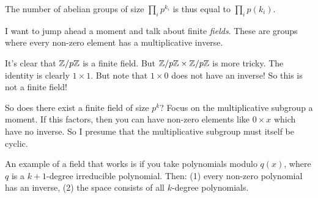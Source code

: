 \begin{remark}
  The number of abelian groups of size $\prod_i p^{k_i}$ is thus equal
  to $\prod_i p(k_i)$.
\end{remark}

\begin{remark}
  I want to jump ahead a moment and talk about finite \emph{fields}.
  These are groups where every non-zero element has a multiplicative
  inverse.

  It's clear that $\mathbb{Z} / p\mathbb{Z}$ is a finite field. But $\mathbb{Z} / p\mathbb{Z} \times \mathbb{Z} / p\mathbb{Z}$
  is more tricky. The identity is clearly $1 \times 1$. But note that $1
  \times 0$ does not have an inverse! So this is not a finite field!

  So does there exist a finite field of size $p^k$? Focus on the
  multiplicative subgroup a moment. If this factors, then you can have
  non-zero elements like $0 \times x$ which have no inverse. So I
  presume that the multiplicative subgroup must itself be cyclic.

  An example of a field that works is if you take polynomials modulo
  $q(x)$, where $q$ is a $k+1$-degree irreducible polynomial. Then: (1)
  every non-zero polynomial has an inverse, (2) the space consists of
  all $k$-degree polynomials.
\end{remark}
